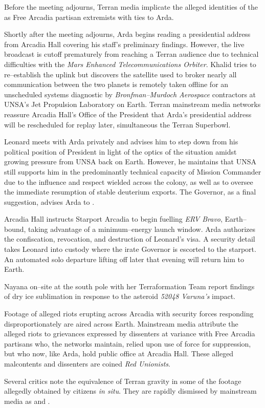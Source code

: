 Before the meeting adjourns, Terran media implicate the alleged identities of the  as Free Arcadia partisan extremists with ties to Arda.

Shortly after the meeting adjourns, Arda begins reading a presidential address from Arcadia Hall covering his staff's preliminary findings. However, the live broadcast is cutoff prematurely from reaching a Terran audience due to technical difficulties with the {\it Mars Enhanced Telecommunications Orbiter}. Khalid tries to re--establish the uplink but discovers the satellite used to broker nearly all communication between the two planets is remotely taken offline for an unscheduled systems diagnostic by {\it Bronfman--Murdoch Aerospace} contractors at UNSA's Jet Propulsion Laboratory on Earth. Terran mainstream media networks reassure Arcadia Hall's Office of the President that Arda's presidential address will be rescheduled for replay later, simultaneous the Terran Superbowl.

Leonard meets with Arda privately and advises him to step down from his political position of President in light of the optics of the situation amidst growing pressure from UNSA back on Earth. However, he maintains that UNSA still supports him in the predominantly technical capacity of Mission Commander due to the influence and respect wielded across the colony, as well as to oversee the immediate resumption of stable deuterium exports. The Governor, as a final suggestion, advises Arda to .
\StopTimelineDate

Arcadia Hall instructs Starport Arcadia to begin fuelling {\it ERV Bravo}, Earth--bound, taking advantage of a minimum--energy launch window. Arda authorizes the confiscation, revocation, and destruction of Leonard's visa. A security detail takes Leonard into custody where the irate Governor is escorted to the starport. An automated solo departure lifting off later that evening will return him to Earth.
\StopTimelineDate

Nayana on--site at the south pole with her Terraformation Team report findings of dry ice sublimation in response to the asteroid {\it 52048 Varuna's} impact.
\StopTimelineDate

Footage of alleged riots erupting across Arcadia with security forces responding disproportionately are aired across Earth. Mainstream media attribute the alleged riots to grievances expressed by dissenters at variance with Free Arcadia partisans who, the networks maintain, relied upon use of force for suppression, but who now, like Arda, hold public office at Arcadia Hall. These alleged malcontents and dissenters are coined {\it Red Unionists}. 

Several critics note the equivalence of Terran gravity in some of the footage allegedly obtained by citizens {\it in situ}. They are rapidly dismissed by mainstream media as  and .
\StopTimelineDate


